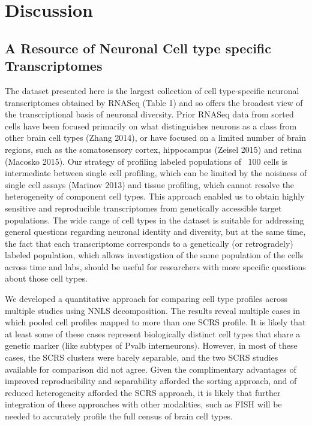 
\section{Discussion}

\subsection{A Resource of Neuronal Cell type specific Transcriptomes}
The dataset presented here is the largest collection of cell type-specific neuronal transcriptomes obtained by RNASeq (Table 1) and so offers the broadest view of the transcriptional basis of neuronal diversity. Prior RNASeq data from sorted cells have been focused primarily on what distinguishes neurons as a class from other brain cell types (Zhang 2014), or have focused on a limited number of brain regions, such as the somatosensory cortex, hippocampus (Zeisel 2015) and retina (Macosko 2015). Our strategy of profiling labeled populations of ~100 cells is intermediate between single cell profiling, which can be limited by the noisiness of single cell assays (Marinov 2013) and tissue profiling, which cannot resolve the heterogeneity of component cell types. This approach enabled us to obtain highly sensitive and reproducible transcriptomes from genetically accessible target populations. The wide range of cell types in the dataset is suitable for addressing general questions regarding neuronal identity and diversity, but at the same time, the fact that each transcriptome corresponds to a genetically (or retrogradely) labeled population, which allows investigation of the same population of the cells across time and labs, should be useful for researchers with more specific questions about those cell types.

We developed a quantitative approach for comparing cell type profiles across multiple studies using NNLS decomposition. The results reveal multiple cases in which pooled cell profiles mapped to more than one SCRS profile. It is likely that at least some of these cases represent biologically distinct cell types that share a genetic marker (like subtypes of Pvalb interneurons). However, in most of these cases, the SCRS clusters were barely separable, and the two SCRS studies available for comparison did not agree. Given the complimentary advantages of improved reproducibility and separability afforded the sorting approach, and of reduced heterogeneity afforded the SCRS approach, it is likely that further integration of these approaches with other modalities, such as FISH \cite{Moffitt_2016} will be needed to accurately profile the full census of brain cell types. 

